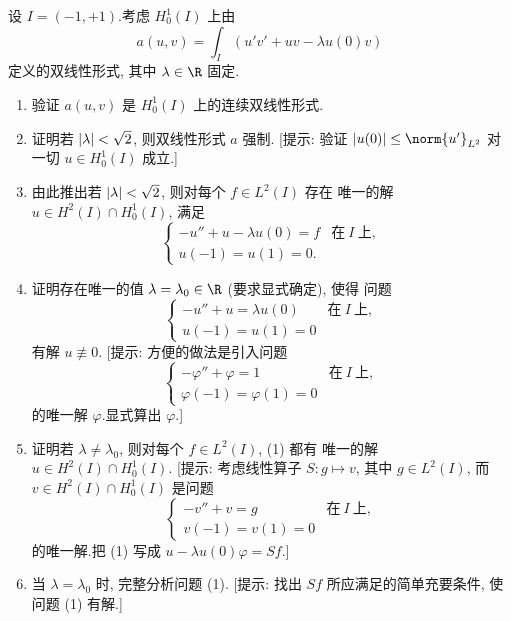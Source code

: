 \begin{exercise}
\label{exer:8.27}
设 $I=(-1,+1)$.考虑 $H_0^1(I)$ 上由
\begin{equation*}
a(u,v)=\int_I(u'v'+uv-\lambda u(0)v)
\end{equation*}
定义的双线性形式, 其中 $\lambda\in\R$ 固定.
\begin{enumerate}[label=\arabic*., leftmargin=2.2em, itemsep=0.3em]
	\item 验证 $a(u,v)$ 是 $H_0^1(I)$ 上的连续双线性形式.
	\item 证明若 $\left|\lambda\right|<\sqrt2$, 则双线性形式 $a$ 强制.
	      [提示: 验证 $\abs{u(0)}\le\norm{u'}_{L^2}$ 对一切
	      $u\in H_0^1(I)$ 成立.]
	\item 由此推出若 $\left|\lambda\right|<\sqrt2$, 则对每个 $f\in L^2(I)$ 存在
	      唯一的解 $u\in H^2(I)\cap H_0^1(I)$, 满足
	      \begin{equation}
	      \begin{cases}
	      -u''+u-\lambda u(0)=f & \text{在}\ I\ \text{上},\\
	      u(-1)=u(1)=0.
	      \end{cases}
	      \tag{1}
	      \end{equation}
	\item 证明存在唯一的值 $\lambda=\lambda_0\in\R$ (要求显式确定), 使得
	      问题
	      \begin{equation}
	      \begin{cases}
	      -u''+u=\lambda u(0) & \text{在}\ I\ \text{上},\\
	      u(-1)=u(1)=0
	      \end{cases}
	      \tag{2}
	      \end{equation}
	      有解 $u\not\equiv0$.
	      [提示: 方便的做法是引入问题
	      \begin{equation}
	      \begin{cases}
	      -\varphi''+\varphi=1 & \text{在}\ I\ \text{上},\\
	      \varphi(-1)=\varphi(1)=0
	      \end{cases}
	      \tag{3}
	      \end{equation}
	      的唯一解 $\varphi$.显式算出 $\varphi$.]
	\item 证明若 $\lambda\ne\lambda_0$, 则对每个 $f\in L^2(I)$, (1) 都有
	      唯一的解 $u\in H^2(I)\cap H_0^1(I)$.
	      [提示: 考虑线性算子 $S:g\mapsto v$, 其中 $g\in L^2(I)$, 而
	      $v\in H^2(I)\cap H_0^1(I)$ 是问题
	      \begin{equation}
	      \begin{cases}
	      -v''+v=g & \text{在}\ I\ \text{上},\\
	      v(-1)=v(1)=0
	      \end{cases}
	      \tag{4}
	      \end{equation}
	      的唯一解.把 (1) 写成 $u-\lambda u(0)\varphi=Sf$.]
	\item 当 $\lambda=\lambda_0$ 时, 完整分析问题 (1).
	      [提示: 找出 $Sf$ 所应满足的简单充要条件, 使问题 (1) 有解.]
\end{enumerate}
\end{exercise}

